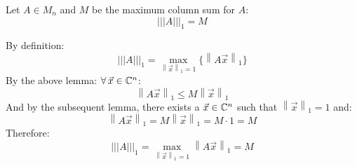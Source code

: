 \documentclass[letterpaper,12pt,fleqn]{article}
\newcommand{\vx}{\vec{x}}
\newcommand{\norm}[1]{\left\lVert#1\right\rVert}
\newcommand{\mnorm}[1]{\left\lvert\left\lvert\left\lvert#1
  \right\rvert\right\rvert\right\rvert}
\begin{document}
\begin{theorem}
  Let $A\in M_n$ and $M$ be the maximum column sum for $A$:
  \[\mnorm{A}_1=M\]
\end{theorem}

\begin{theproof}
  By definition:
  \[\mnorm{A}_1=\max_{\norm{\vx}_1=1}\{\norm{A\vx}_1\}\]
  By the above lemma: $\forall\,\vx\in\C^n$:
  \[\norm{A\vx}_1\le M\norm{\vx}_1\]
  And by the subsequent lemma, there exists a $\vx\in\C^n$ such that
  $\norm{\vx}_1=1$ and:
  \[\norm{A\vx}_1=M\norm{\vx}_1=M\cdot1=M\]
  Therefore:
  \[\mnorm{A}_1=\max_{\norm{\vx}_1=1}\norm{A\vx}_1=M\]
\end{theproof}
\end{document}

